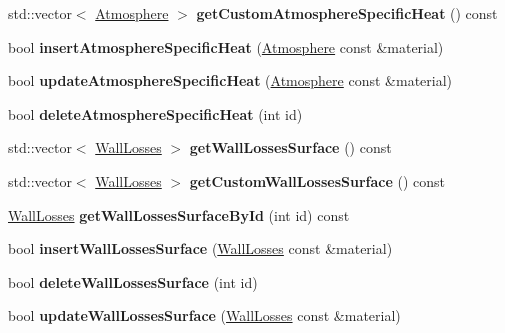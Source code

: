 \begin{DoxyCompactItemize}
std\+::vector$<$ \hyperlink{class_atmosphere}{Atmosphere} $>$ {\bfseries get\+Custom\+Atmosphere\+Specific\+Heat} () const
\item 
\mbox{\label{class_s_q_lite_a5be90371486d63abd80668c19682051b}} 
bool {\bfseries insert\+Atmosphere\+Specific\+Heat} (\hyperlink{class_atmosphere}{Atmosphere} const \&material)
\item 
\mbox{\label{class_s_q_lite_a0980ef2dfdaadb27f86342f983019bb7}} 
bool {\bfseries update\+Atmosphere\+Specific\+Heat} (\hyperlink{class_atmosphere}{Atmosphere} const \&material)
\item 
\mbox{\label{class_s_q_lite_a32f61e2c425864cf222ee427abd33448}} 
bool {\bfseries delete\+Atmosphere\+Specific\+Heat} (int id)
\item 
\mbox{\label{class_s_q_lite_ac385b0462588b7a18349d1621ceac57c}} 
std\+::vector$<$ \hyperlink{class_wall_losses}{Wall\+Losses} $>$ {\bfseries get\+Wall\+Losses\+Surface} () const
\item 
\mbox{\label{class_s_q_lite_aaf414f89916731a94d8c81a98d36987d}} 
std\+::vector$<$ \hyperlink{class_wall_losses}{Wall\+Losses} $>$ {\bfseries get\+Custom\+Wall\+Losses\+Surface} () const
\item 
\mbox{\label{class_s_q_lite_a3a7f473d8e23630dae65cd3c3dd7fa97}} 
\hyperlink{class_wall_losses}{Wall\+Losses} {\bfseries get\+Wall\+Losses\+Surface\+By\+Id} (int id) const
\item 
\mbox{\label{class_s_q_lite_a97d510f6f16aa70c61a9dc6a629ad786}} 
bool {\bfseries insert\+Wall\+Losses\+Surface} (\hyperlink{class_wall_losses}{Wall\+Losses} const \&material)
\item 
\mbox{\label{class_s_q_lite_ab9492a672cb89dfeae330b99ea03ceeb}} 
bool {\bfseries delete\+Wall\+Losses\+Surface} (int id)
\item 
\mbox{\label{class_s_q_lite_ac4b7397ef51a0544d38f670ef995f26e}} 
bool {\bfseries update\+Wall\+Losses\+Surface} (\hyperlink{class_wall_losses}{Wall\+Losses} const \&material)
\item 

\end{DoxyCompactItemize}
